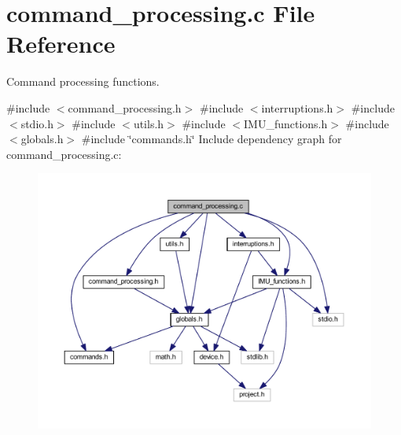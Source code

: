 \section{command\+\_\+processing.\+c File Reference}
\label{command__processing_8c}


Command processing functions.  


{\ttfamily \#include $<$command\+\_\+processing.\+h$>$}\newline
{\ttfamily \#include $<$interruptions.\+h$>$}\newline
{\ttfamily \#include $<$stdio.\+h$>$}\newline
{\ttfamily \#include $<$utils.\+h$>$}\newline
{\ttfamily \#include $<$I\+M\+U\+\_\+functions.\+h$>$}\newline
{\ttfamily \#include $<$globals.\+h$>$}\newline
{\ttfamily \#include \char`\"{}commands.\+h\char`\"{}}\newline
Include dependency graph for command\+\_\+processing.\+c\+:
\nopagebreak
\begin{figure}[H]
\begin{center}
\leavevmode
\includegraphics[width=350pt]{command__processing_8c__incl}
\end{center}
\end{figure}
